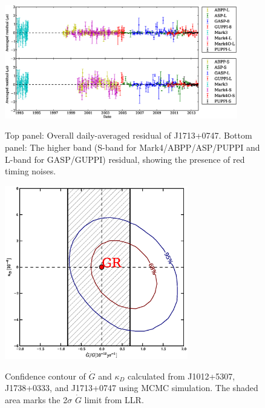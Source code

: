 \documentclass[12pt,preprint]{aastex}
\begin{document}
\begin{figure}
\includegraphics[width=4in]{residual.eps} \\ 
\caption {\label{fig:res} Top panel: Overall daily-averaged residual of
J1713+0747. Bottom panel: The higher band (S-band for Mark4/ABPP/ASP/PUPPI and
L-band for GASP/GUPPI) residual, showing the presence of red timing noises.} 
\end{figure} 

\begin{figure}
\includegraphics[width=8cm]{GdotContour.ps} \\ 
\caption {\label{fig:Gdot} Confidence contour of $\dot{G}$ and $\kappa_D$
calculated from J1012+5307, J1738+0333, and J1713+0747 using MCMC simulation.
The shaded area marks the 2$\sigma$ $\dot{G}$ limit from LLR. 
} 
\end{figure} 



\end{document}
